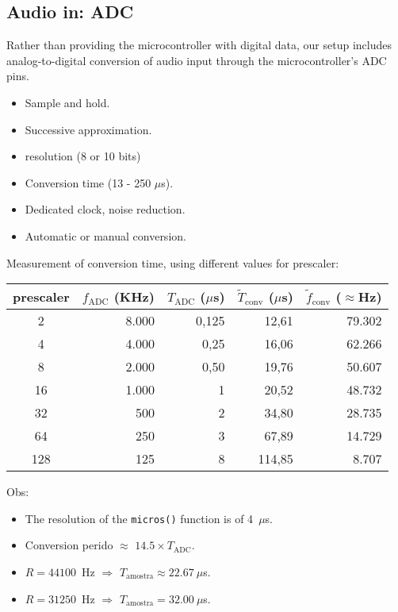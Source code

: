 \subsection{Audio in: ADC}

Rather than providing the microcontroller with digital data, our setup
includes analog-to-digital conversion of audio input through the
microcontroller's ADC pins.

\begin{itemize}
    \item Sample and hold.
    \item Successive approximation.
    \item resolution (8 or 10 bits)
    \item Conversion time (13 - 250 $\mu$s).
    \item Dedicated clock, noise reduction.
    \item Automatic or manual conversion.
\end{itemize}


Measurement of conversion time, using different values for prescaler:

\begin{center}
\begin{tabular}{crrrr}
\toprule
\toprule
\footnotesize{prescaler} & \footnotesize{$f_\text{ADC}$ (KHz)} &
\footnotesize{$T_\text{ADC}$ ($\mu$s)} & \footnotesize{$\tilde{T}_\text{conv}$ ($\mu$s)} & \footnotesize{$\tilde{f}_\text{conv}$ ($\approx$Hz)} \\
\midrule
2 & 8.000 & 0,125 & 12,61 & 79.302\\
4 & 4.000 & 0,25 & 16,06  & 62.266 \\
8 & 2.000 & 0,50 & 19,76  & 50.607 \\
16& 1.000 & 1 & 20,52  & 48.732 \\
32& 500 & 2 & 34,80  & 28.735 \\
64& 250 & 3 & 67,89  & 14.729 \\
128& 125 & 8 & 114,85 & 8.707  \\
\bottomrule
\end{tabular}
\end{center}
Obs:
\begin{itemize}
  \item The resolution of the \texttt{micros()} function is of 4~$\mu$s.
  \item Conversion perido $\approx$ $14.5 \times T_\text{ADC}$. 
  \item $R=44100$~Hz $\Rightarrow$ $T_\text{amostra} \approx 22.67~\mu$s.
  \item $R=31250$~Hz $\Rightarrow$ $T_\text{amostra} = 32.00~\mu$s.
\end{itemize}

